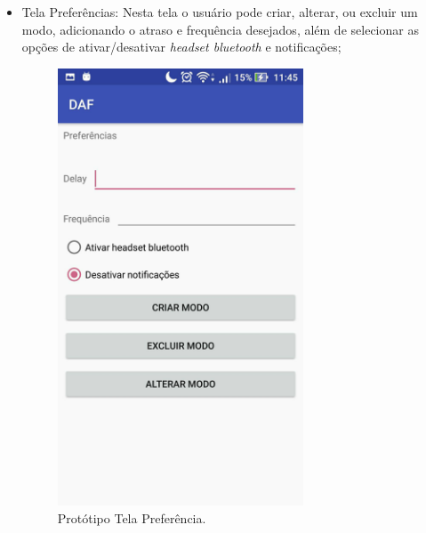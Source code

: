 \begin{itemize}
	\item Tela Prefer\^encias: Nesta tela o usu\'ario pode criar, alterar, ou excluir um modo, adicionando o atraso e frequ\^encia desejados, al\'em de selecionar as op\c{c}\~oes de ativar/desativar \textit{headset bluetooth} e notifica\c{c}\~oes;
	\begin{figure}[H]
		\centering
		\caption[Prot\'otipo Tela Prefer\^encias]{Prot\'otipo Tela Prefer\^encia. \label{fig:prototipotelapreferencias}}
		\includegraphics[height=13cm]{./Figuras/prototipo_telapreferencias.jpg}%
	\end{figure}


\end{itemize}
